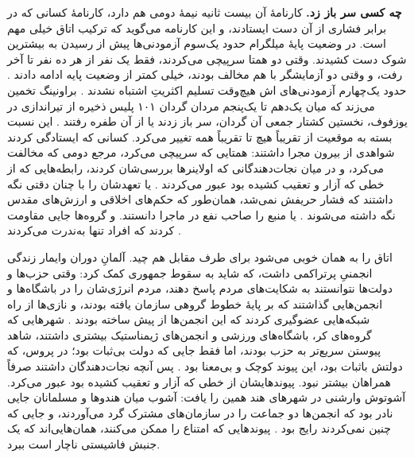 \textbf{چه کسی سر باز زد.} کارنامهٔ آن بیست ثانیه نیمهٔ دومی هم دارد، کارنامهٔ کسانی که در برابر فشاری از آن دست ایستادند، و این کارنامه می‌گوید که ترکیب اتاق خیلی مهم است. در وضعیت پایهٔ میلگرام حدود یک‌سوم آزمودنی‌ها پیش از رسیدن به بیشترین شوک دست کشیدند. وقتی دو همتا سرپیچی می‌کردند، فقط یک نفر از هر ده نفر تا آخر رفت، و وقتی دو آزمایشگر با هم مخالف بودند، خیلی کمتر از وضعیت پایه ادامه دادند \autocite{milgram1974obedience}. حدود یک‌چهارم آزمودنی‌های اش هیچ‌وقت تسلیم اکثریتِ اشتباه نشدند \autocite{asch1956studies}. براونینگ تخمین می‌زند که میان یک‌دهم تا یک‌پنجم مردان گردان ۱۰۱ پلیس ذخیره از تیراندازی در یوزفوف، نخستین کشتار جمعی آن گردان، سر باز زدند یا از آن طفره رفتند \autocite{browning1992ordinary}. این نسبت بسته به موقعیت از تقریباً هیچ تا تقریباً همه تغییر می‌کرد. کسانی که ایستادگی کردند شواهدی از بیرون مجرا داشتند: همتایی که سرپیچی می‌کرد، مرجع دومی که مخالفت می‌کرد، و در میان نجات‌دهندگانی که اولاینرها بررسی‌شان کردند، رابطه‌هایی که از خطی که آزار و تعقیب کشیده بود عبور می‌کردند \autocite{oliner1988altruistic}. یا تعهدشان را با چنان دقتی نگه داشتند که فشار حریفش نمی‌شد، همان‌طور که حکم‌های اخلاقی و ارزش‌های مقدس نگه داشته می‌شوند \autocite{skitka2009limits,ginges2007sacred}. یا منبع را صاحب نفع در ماجرا دانستند. و گروه‌ها جایی مقاومت کردند که افراد تنها به‌ندرت می‌کردند \autocite{gamson1982encounters}.

اتاق را به همان خوبی می‌شود برای طرف مقابل هم چید. آلمانِ دوران وایمار زندگی انجمنیِ پرتراکمی داشت، که شاید به سقوط جمهوری کمک کرد: وقتی حزب‌ها و دولت‌ها نتوانستند به شکایت‌های مردم پاسخ دهند، مردم انرژی‌شان را در باشگاه‌ها و انجمن‌هایی گذاشتند که بر پایهٔ خطوط گروهی سازمان یافته بودند، و نازی‌ها از راه شبکه‌هایی عضوگیری کردند که این انجمن‌ها از پیش ساخته بودند \autocite{berman1997weimar}. شهرهایی که گروه‌های کر، باشگاه‌های ورزشی و انجمن‌های ژیمناستیک بیشتری داشتند، شاهد پیوستن سریع‌تر به حزب بودند، اما فقط جایی که دولت بی‌ثبات بود؛ در پروس، که دولتش باثبات بود، این پیوند کوچک و بی‌معنا بود \autocite{satyanath2017bowling}. پس آنچه نجات‌دهندگان داشتند صرفاً همراهان بیشتر نبود. پیوندهایشان از خطی که آزار و تعقیب کشیده بود عبور می‌کرد. آشوتوش وارشنی در شهرهای هند همین را یافت: آشوب میان هندوها و مسلمانان جایی نادر بود که انجمن‌ها دو جماعت را در سازمان‌های مشترک گرد می‌آوردند، و جایی که چنین نمی‌کردند رایج بود \autocite{varshney2002ethnic}. پیوندهایی که امتناع را ممکن می‌کنند، همان‌هایی‌اند که یک جنبش فاشیستی ناچار است ببرد.

